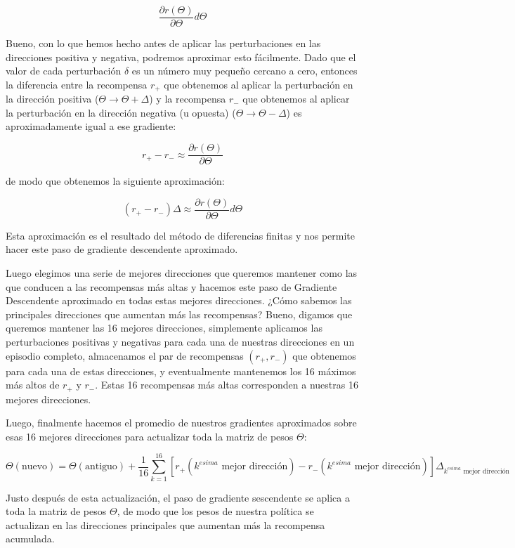 \documentclass[
]{book}
\begin{document}
\[\frac{\partial r(\Theta)}{\partial \Theta} d \Theta\]

Bueno, con lo que hemos hecho antes de aplicar las perturbaciones en las direcciones positiva y negativa, podremos aproximar esto fácilmente. Dado que el valor de cada perturbación \(\delta\) es un número muy pequeño cercano a cero, entonces la diferencia entre la recompensa \(r_{+}\) que obtenemos al aplicar la perturbación en la dirección positiva (\(\Theta\rightarrow\Theta + \Delta\)) y la recompensa \(r_{-}\) que obtenemos al aplicar la perturbación en la dirección negativa (u opuesta) (\(\Theta\rightarrow\Theta - \Delta\)) es aproximadamente igual a ese gradiente:

\[r_{+} - r_{-} \approx \frac{\partial r(\Theta)}{\partial \Theta}\]

de modo que obtenemos la siguiente aproximación:

\[(r_{+} - r_{-}) \Delta \approx \frac{\partial r(\Theta)}{\partial \Theta} d \Theta\]

Esta aproximación es el resultado del método de diferencias finitas y nos permite hacer este paso de gradiente descendente aproximado.

Luego elegimos una serie de mejores direcciones que queremos mantener como las que conducen a las recompensas más altas y hacemos este paso de Gradiente Descendente aproximado en todas estas mejores direcciones. ¿Cómo sabemos las principales direcciones que aumentan más las recompensas? Bueno, digamos que queremos mantener las 16 mejores direcciones, simplemente aplicamos las perturbaciones positivas y negativas para cada una de nuestras direcciones en un episodio completo, almacenamos el par de recompensas \((r_{+}, r_{-})\) que obtenemos para cada una de estas direcciones, y eventualmente mantenemos los 16 máximos más altos de \(r_{+}\) y \(r_{-}\). Estas 16 recompensas más altas corresponden a nuestras 16 mejores direcciones.

Luego, finalmente hacemos el promedio de nuestros gradientes aproximados sobre esas 16 mejores direcciones para actualizar toda la matriz de pesos \(\Theta\):

\[
\Theta(\textrm{nuevo}) = \Theta(\textrm{antiguo}) + \frac{1}{16}\sum_{k=1}^{16} [r_{+}(\textrm{$k^{esima}$ mejor dirección}) - r_{-}(\textrm{$k^{esima}$ mejor dirección})] \Delta_{\textrm{$k^{esima}$ mejor dirección}}
\]

Justo después de esta actualización, el paso de gradiente sescendente se aplica a toda la matriz de pesos \(\Theta\), de modo que los pesos de nuestra política se actualizan en las direcciones principales que aumentan más la recompensa acumulada.
\end{document}

